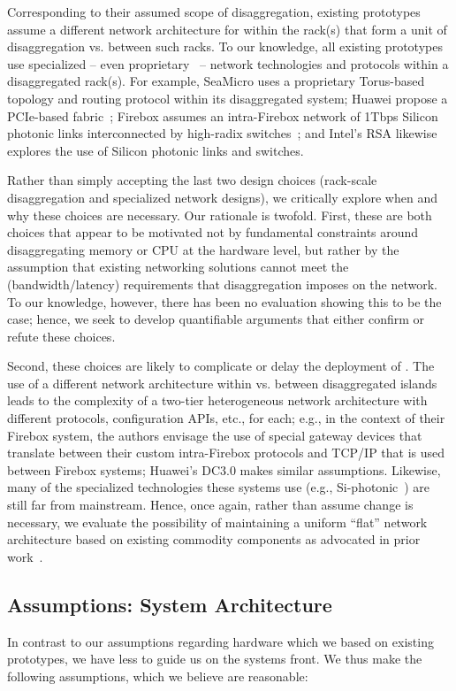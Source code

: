 Corresponding to their assumed scope of disaggregation, existing prototypes assume a different network architecture for within the rack(s) that form a unit of disaggregation vs. between such racks. To our knowledge, all existing \dis prototypes use specialized -- even proprietary~\cite{seamicro,huawei,rsa} -- network technologies and protocols within a disaggregated rack(s). For example, SeaMicro uses a proprietary Torus-based topology and routing protocol within its disaggregated system; Huawei propose a PCIe-based fabric~\cite{huawei1}; Firebox assumes an intra-Firebox network of 1Tbps Silicon photonic links interconnected by high-radix switches~\cite{firebox,vladimir}; and Intel's RSA likewise explores the use of Silicon photonic links and switches. 

Rather than simply accepting the last two design choices (rack-scale disaggregation and specialized network designs), we critically explore when and why these choices are necessary. Our rationale is twofold. 
First, these are both choices that appear to be motivated not by fundamental constraints around disaggregating memory or CPU at the hardware level, but rather by the assumption that existing networking solutions cannot meet the (bandwidth/latency) requirements that disaggregation imposes on the network. To our knowledge, however, there has been no  evaluation showing this to be the case; hence, we seek to develop quantifiable arguments that either confirm or refute these choices. 

Second, these choices are likely to complicate or delay the deployment of \dis. The use of a different network architecture within vs. between disaggregated islands leads to the complexity of a two-tier heterogeneous network architecture with different protocols, configuration APIs, etc., for each; e.g., in the context of their Firebox system, the authors envisage the use of special gateway devices that translate between their custom intra-Firebox protocols and TCP/IP that is used between Firebox systems; Huawei's DC3.0 makes similar assumptions. Likewise, many of the specialized technologies these systems use (e.g., Si-photonic~\cite{vladimir-nature}) are still far from mainstream. 
Hence, once again, rather than assume change is necessary, we evaluate the possibility of maintaining a uniform ``flat'' network architecture based on existing commodity components as advocated in prior work~\cite{el-fares,vl2,greenberg-costs}. 
%
%
%
\subsection{Assumptions: System Architecture}
\label{ssec:system}
In contrast to our assumptions regarding hardware which we based on existing  prototypes, we have less to guide us on the systems front. We thus make the following assumptions, which we believe are reasonable: 

